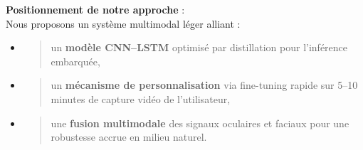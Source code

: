 \documentclass[
]{article}
\begin{document}
\textbf{Positionnement de notre approche} :\\
Nous proposons un système multimodal léger alliant :

\begin{itemize}
\item
  \begin{quote}
  un \textbf{modèle CNN--LSTM} optimisé par distillation pour l'inférence embarquée,
  \end{quote}
\item
  \begin{quote}
  un \textbf{mécanisme de personnalisation} via fine-tuning rapide sur 5--10\,minutes de capture vidéo de l'utilisateur,
  \end{quote}
\item
  \begin{quote}
  une \textbf{fusion multimodale} des signaux oculaires et faciaux pour une robustesse accrue en milieu naturel.
  \end{quote}
\end{itemize}

\hypertarget{section-26}{%
\subsection{}\label{section-26}}

\hypertarget{section-27}{%
\subsection{}\label{section-27}}

\hypertarget{section-28}{%
\subsection{}\label{section-28}}

\hypertarget{section-29}{%
\subsection{}\label{section-29}}

\hypertarget{section-30}{%
\subsection{}\label{section-30}}

\hypertarget{section-31}{%
\subsection{}\label{section-31}}
\end{document}
